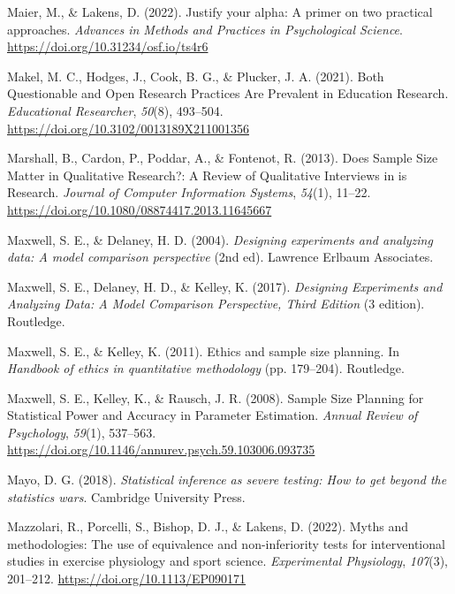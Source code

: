 \documentclass[
  oneside]{krantz}
\newlength{\cslhangindent}
\newlength{\cslentryspacingunit} %
\newenvironment{CSLReferences}[2] %
 {%
  \setlength{\parindent}{0pt}
  \ifodd #1
  \let\oldpar\par
  \def\par{\hangindent=\cslhangindent\oldpar}
  \fi
  \setlength{\parskip}{#2\cslentryspacingunit}
 }%
 {}
\begin{document}
\begin{CSLReferences}{1}{0}
\leavevmode{}%
Maier, M., \& Lakens, D. (2022). Justify your alpha: {A} primer on two
practical approaches. \emph{Advances in Methods and Practices in
Psychological Science}. \url{https://doi.org/10.31234/osf.io/ts4r6}

\leavevmode{}%
Makel, M. C., Hodges, J., Cook, B. G., \& Plucker, J. A. (2021). Both
{Questionable} and {Open Research Practices Are Prevalent} in {Education
Research}. \emph{Educational Researcher}, \emph{50}(8), 493--504.
\url{https://doi.org/10.3102/0013189X211001356}

\leavevmode{}%
Marshall, B., Cardon, P., Poddar, A., \& Fontenot, R. (2013). Does
{Sample Size Matter} in {Qualitative Research}?: {A Review} of
{Qualitative Interviews} in is {Research}. \emph{Journal of Computer
Information Systems}, \emph{54}(1), 11--22.
\url{https://doi.org/10.1080/08874417.2013.11645667}

\leavevmode{}%
Maxwell, S. E., \& Delaney, H. D. (2004). \emph{Designing experiments
and analyzing data: A model comparison perspective} (2nd ed). {Lawrence
Erlbaum Associates}.

\leavevmode{}%
Maxwell, S. E., Delaney, H. D., \& Kelley, K. (2017). \emph{Designing
{Experiments} and {Analyzing Data}: {A Model Comparison Perspective},
{Third Edition}} (3 edition). {Routledge}.

\leavevmode{}%
Maxwell, S. E., \& Kelley, K. (2011). Ethics and sample size planning.
In \emph{Handbook of ethics in quantitative methodology} (pp. 179--204).
{Routledge}.

\leavevmode{}%
Maxwell, S. E., Kelley, K., \& Rausch, J. R. (2008). Sample {Size
Planning} for {Statistical Power} and {Accuracy} in {Parameter
Estimation}. \emph{Annual Review of Psychology}, \emph{59}(1), 537--563.
\url{https://doi.org/10.1146/annurev.psych.59.103006.093735}

\leavevmode{}%
Mayo, D. G. (2018). \emph{Statistical inference as severe testing: How
to get beyond the statistics wars}. {Cambridge University Press}.

\leavevmode{}%
Mazzolari, R., Porcelli, S., Bishop, D. J., \& Lakens, D. (2022). Myths
and methodologies: {The} use of equivalence and non-inferiority tests
for interventional studies in exercise physiology and sport science.
\emph{Experimental Physiology}, \emph{107}(3), 201--212.
\url{https://doi.org/10.1113/EP090171}


\end{CSLReferences}
\end{document}
